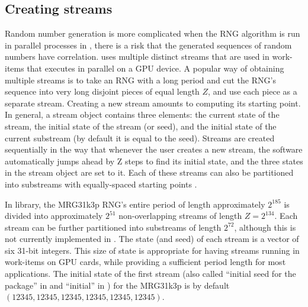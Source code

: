 \documentclass[article,nojss]{jss}\usepackage[]{graphicx}\usepackage[]{color}
\begin{document}
\subsection{Creating streams}\label{createstreams}
Random number generation is more complicated when the RNG algorithm is run in parallel processes in , there is a risk that the generated sequences of random numbers have correlation.  uses multiple distinct streams that are used in work-items that executes in parallel on a GPU device. A popular way of obtaining multiple streams is to take an RNG with a long period and cut the RNG's sequence into very long disjoint pieces of equal length $Z$, and use each piece as a separate stream. Creating a new stream amounts to computing its starting point. In general, a stream object contains three elements: the current state of the stream, the initial state of the stream (or seed), and the initial state of the current substream (by default it is equal to the seed). Streams are created sequentially in the way that whenever the user creates a new stream, the software automatically jumps ahead by Z steps to find its initial state, and the three states in the stream object are set to it. Each of these streams can also be partitioned into substreams with equally-spaced starting points \citep{l2002object, rLEC15a}.

In  library, the MRG31k3p RNG's entire period of length approximately $2^{185}$ is divided into approximately $2^{51}$ non-overlapping streams of length $Z = 2^{134}$. Each stream can be further partitioned into substreams of length $2^{72}$, although this is not currently implemented in . The state (and seed) of each stream is a vector of six 31-bit integers. This size of state is appropriate for having streams running in work-items on GPU cards, while providing a sufficient period length for most applications. The initial state of the first stream (also called ``initial seed for the package'' in  and ``initial'' in ) for the MRG31k3p is by default $(12345, 12345, 12345, 12345, 12345, 12345)$. 
\end{document}
